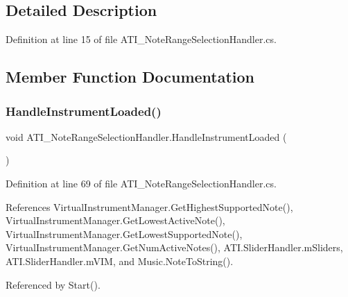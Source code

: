 \subsection{Detailed Description}


Definition at line 15 of file A\+T\+I\+\_\+\+Note\+Range\+Selection\+Handler.\+cs.



\subsection{Member Function Documentation}
\mbox{\label{class_a_t_i___note_range_selection_handler_a4063aee2ca06e3fbe11f4cd899b5581f}} 
\subsubsection{\texorpdfstring{Handle\+Instrument\+Loaded()}{HandleInstrumentLoaded()}}
{\footnotesize\ttfamily void A\+T\+I\+\_\+\+Note\+Range\+Selection\+Handler.\+Handle\+Instrument\+Loaded (\begin{DoxyParamCaption}{ }\end{DoxyParamCaption})\hspace{0.3cm}{\ttfamily [private]}}



Definition at line 69 of file A\+T\+I\+\_\+\+Note\+Range\+Selection\+Handler.\+cs.



References Virtual\+Instrument\+Manager.\+Get\+Highest\+Supported\+Note(), Virtual\+Instrument\+Manager.\+Get\+Lowest\+Active\+Note(), Virtual\+Instrument\+Manager.\+Get\+Lowest\+Supported\+Note(), Virtual\+Instrument\+Manager.\+Get\+Num\+Active\+Notes(), A\+T\+I.\+Slider\+Handler.\+m\+Sliders, A\+T\+I.\+Slider\+Handler.\+m\+V\+IM, and Music.\+Note\+To\+String().



Referenced by Start().


